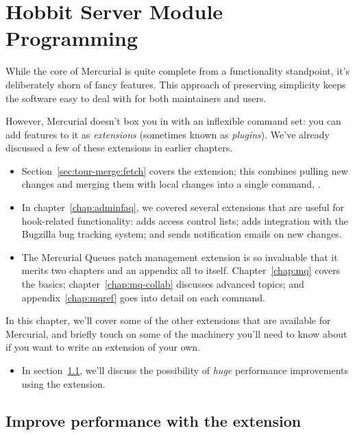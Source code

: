 \chapter{Hobbit Server Module Programming}
\label{chap:hobbit-server-module}

While the core of Mercurial is quite complete from a functionality
standpoint, it's deliberately shorn of fancy features.  This approach
of preserving simplicity keeps the software easy to deal with for both
maintainers and users.

However, Mercurial doesn't box you in with an inflexible command set:
you can add features to it as \emph{extensions} (sometimes known as
\emph{plugins}).  We've already discussed a few of these extensions in
earlier chapters.
\begin{itemize}
\item Section~\ref{sec:tour-merge:fetch} covers the 
  extension; this combines pulling new changes and merging them with
  local changes into a single command, .
\item In chapter~\ref{chap:adminfaq}, we covered several extensions that
  are useful for hook-related functionality:  adds access
  control lists;  adds integration with the Bugzilla
  bug tracking system; and  sends notification emails on
  new changes.
\item The Mercurial Queues patch management extension is so invaluable
  that it merits two chapters and an appendix all to itself.
  Chapter~\ref{chap:mq} covers the basics;
  chapter~\ref{chap:mq-collab} discusses advanced topics; and
  appendix~\ref{chap:mqref} goes into detail on each command.
\end{itemize}

In this chapter, we'll cover some of the other extensions that are
available for Mercurial, and briefly touch on some of the machinery
you'll need to know about if you want to write an extension of your
own.
\begin{itemize}
\item In section~\ref{sec:hgext:inotify}, we'll discuss the
  possibility of \emph{huge} performance improvements using the
   extension.
\end{itemize}

\section{Improve performance with the  extension}
\label{sec:hgext:inotify}

